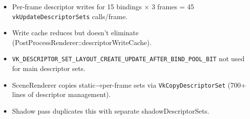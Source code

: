 \documentclass[11pt,a4paper]{article}
\begin{document}
\begin{itemize}
    \item Per-frame descriptor writes for 15 bindings × 3 frames = 45 \texttt{vkUpdateDescriptorSets} calls/frame.
    \item Write cache reduces but doesn't eliminate (PostProcessRenderer::descriptorWriteCache).
    \item \texttt{VK\_DESCRIPTOR\_SET\_LAYOUT\_CREATE\_UPDATE\_AFTER\_BIND\_POOL\_BIT} not used for main descriptor sets.
    \item SceneRenderer copies static→per-frame sets via \texttt{VkCopyDescriptorSet} (700+ lines of descriptor management).
    \item Shadow pass duplicates this with separate shadowDescriptorSets.
\end{itemize}
\end{document}
